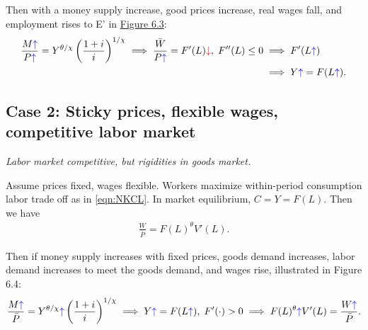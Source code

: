 \documentclass[../main.tex]{subfiles}
\begin{document}
        Then with a money supply increase, good prices increase, real wages fall, and employment rises to E' in \hyperref[fig:6.3]{Figure 6.3}:
        \begin{align}
            \frac{M \textcolor{blue}{\uparrow}}{P \textcolor{blue}{\uparrow}} = Y^{\theta/\chi} \left(\frac{1+i}{i}\right)^{1/\chi}
            \implies
            \frac{\bar W}{P \textcolor{blue}{\uparrow}}
            = F'(L) \textcolor{red}{\downarrow},
            \; F''(L) \le 0
            &\implies
            F'(L \textcolor{blue}{\uparrow})
            \\
            &\implies
            Y \textcolor{blue}{\uparrow} = F(L \textcolor{blue}{\uparrow}).
        \end{align}
        
    \subsection*{Case 2: Sticky prices, flexible wages, competitive labor market}
        \emph{Labor market competitive, but rigidities in goods market.}
    
        \vspace{0.25cm}
        
        Assume prices fixed, wages flexible. Workers maximize within-period consumption labor trade off as in \eqref{eqn:NKCL}. In market equilibrium, $C = Y = F(L)$. Then we have
        \begin{align}
            \frac{W}{\bar P}
            = F(L)^{\theta} V'(L).
        \end{align}
        
        Then if money supply increases with fixed prices, goods demand increases, labor demand increases to meet the goods demand, and wages rise, illustrated in Figure 6.4:
        \begin{align}
            \frac{M \textcolor{blue}{\uparrow}}{\bar P} = Y^{\theta/\chi} \textcolor{blue}{\uparrow} \left(\frac{1+i}{i}\right)^{1/\chi}
            \implies
            Y \textcolor{blue}{\uparrow} = F(L \textcolor{blue}{\uparrow}), \; F'(\cdot) > 0
            \implies
            F(L)^{\theta} \textcolor{blue}{\uparrow} V'(L)
            =\frac{W \textcolor{blue}{\uparrow}}{\bar P}.
        \end{align}
        
\end{document}
